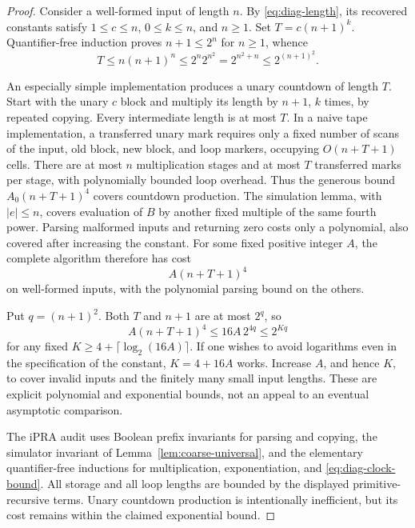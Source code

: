 \begin{proof}
Consider a well-formed input of length \(n\).  By \eqref{eq:diag-length}, its recovered constants
satisfy \(1\leq c\leq n\), \(0\leq k\leq n\), and \(n\geq1\).  Set
\(T=c(n+1)^k\).  Quantifier-free induction proves \(n+1\leq2^n\) for
\(n\geq1\), whence
\begin{equation}
  T\leq n(n+1)^n
    \leq 2^n 2^{n^2}
    =2^{n^2+n}
    \leq 2^{(n+1)^2}.
  \label{eq:diag-clock-bound}
\end{equation}

An especially simple implementation produces a unary countdown of length
\(T\).  Start with the unary \(c\) block and multiply its length by \(n+1\),
\(k\) times, by repeated copying.  Every intermediate length is at most
\(T\).  In a naive tape implementation, a transferred unary mark requires
only a fixed number of scans of the input, old block, new block, and loop
markers, occupying \(O(n+T+1)\) cells.  There are at most \(n\) multiplication
stages and at most \(T\) transferred marks per stage, with polynomially
bounded loop overhead.  Thus the generous bound
\(A_0(n+T+1)^4\) covers countdown production.  The simulation lemma, with
\(|e|\leq n\), covers evaluation of \(B\) by another fixed multiple of the
same fourth power.  Parsing malformed inputs and returning zero costs only
a polynomial, also covered after increasing the constant.  For some fixed
positive integer \(A\), the complete algorithm therefore has cost
\[
  A(n+T+1)^4
\]
on well-formed inputs, with the polynomial parsing bound on the others.

Put \(q=(n+1)^2\).  Both \(T\) and \(n+1\) are at most \(2^q\), so
\[
  A(n+T+1)^4\leq 16A\,2^{4q}\leq2^{Kq}
\]
for any fixed \(K\geq4+\lceil\log_2(16A)\rceil\).  If one wishes to avoid
logarithms even in the specification of the constant, \(K=4+16A\) works.
Increase \(A\), and hence \(K\), to cover invalid inputs and the finitely many
small input lengths.  These are explicit polynomial and exponential bounds,
not an appeal to an eventual asymptotic comparison.

The iPRA audit uses Boolean prefix invariants for parsing and copying, the
simulator invariant of Lemma~\ref{lem:coarse-universal}, and the elementary
quantifier-free inductions for multiplication, exponentiation, and \eqref{eq:diag-clock-bound}.
All storage and all loop lengths are bounded by the displayed
primitive-recursive terms.  Unary countdown production is intentionally
inefficient, but its cost remains within the claimed exponential bound.
\end{proof}

